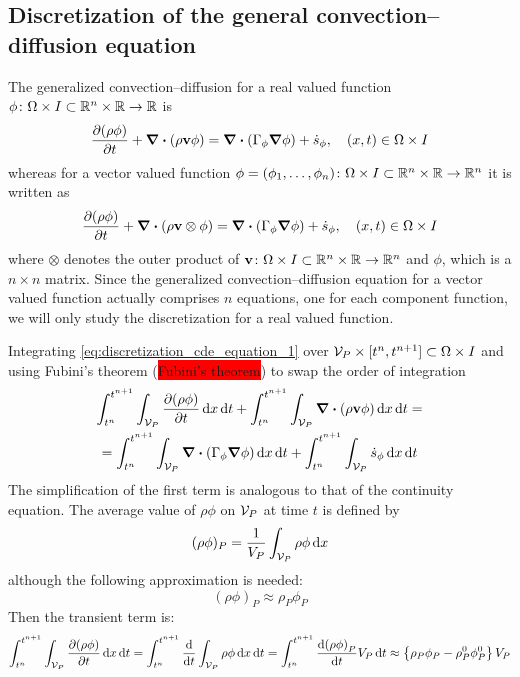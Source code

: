 
\subsection{Discretization of the general convection--diffusion equation}

The generalized convection--diffusion for a real valued function $\phi \colon
\Omega \times I \subset \mathbb{R}^n \times \mathbb{R} \rightarrow \mathbb{R}$ is
\begin{equation} \label{eq:discretization_cde_equation_1}
	\pdv{(\rho \phi)}{t} + \div(\rho \vb{v} \phi) = 
	\div(\Gamma_\phi \grad{\phi}) + \dot{s}_\phi,
	\quad (x, t) \in \Omega \times I
\end{equation}
whereas for a vector valued function $\phi = (\phi_1, \ldots, \phi_n) \colon
\Omega \times I \subset \mathbb{R}^n \times \mathbb{R} \rightarrow \mathbb{R}^n$ it is written
as
\begin{equation}
	\pdv{(\rho \phi)}{t} + \div(\rho \vb{v} \otimes \phi) = 
	\div(\Gamma_\phi \grad{\phi}) + \dot{s}_\phi,
	\quad (x, t) \in \Omega \times I
\end{equation}
where $\otimes$ denotes the outer product of $\vb{v} \colon \Omega \times I
\subset \mathbb{R}^n \times \mathbb{R} \rightarrow \mathbb{R}^n$ and $\phi$, which is a $n
\times n$ matrix. Since the generalized convection--diffusion equation for a
vector valued function actually comprises $n$ equations, one for each component
function, we will only study the discretization for a real valued function.

Integrating \eqref{eq:discretization_cde_equation_1} over $\mathcal{V}_{P} \times [t^n,
t^{n+1}] \subset \Omega \times I$ and using Fubini's theorem
(\colorbox{red}{Fubini's theorem}) to swap the order of integration
\begin{multline}
	\int_{t^n}^{t^{n+1}} \int_{\mathcal{V}_{P}} \pdv{(\rho \phi)}{t} \dd{x} \dd{t} + 
	\int_{t^n}^{t^{n+1}} \int_{\mathcal{V}_{P}} \div(\rho \vb{v} \phi) \dd{x} \dd{t} = \\ = 
	\int_{t^n}^{t^{n+1}} \int_{\mathcal{V}_{P}} \div(\Gamma_\phi \grad{\phi}) \dd{x} \dd{t} +
	\int_{t^n}^{t^{n+1}} \int_{\mathcal{V}_{P}} \dot{s}_\phi \dd{x} \dd{t}	
\end{multline}
The simplification of the first term is analogous to that of the continuity
equation. The average value of $\rho \phi$ on $\mathcal{V}_{P}$ at time $t$ is defined by
\begin{equation}
	(\rho \phi)_P = \frac{1}{V_P} \int_{\mathcal{V}_{P}} \rho \phi \dd{x}
\end{equation}
although the following approximation is needed:
\begin{equation}
	(\rho \phi)_P \approx \rho_P \phi_P
\end{equation}
Then the transient term is:
\begin{equation}
	\int_{t^n}^{t^{n+1}} \int_{\mathcal{V}_{P}} \pdv{(\rho \phi)}{t} \dd{x} \dd{t} = 
	\int_{t^n}^{t^{n+1}} \frac{\dd}{\dd{t}} \int_{\mathcal{V}_{P}} \rho \phi \dd{x} \dd{t} =  
	\int_{t^n}^{t^{n+1}} \frac{\dd(\rho \phi)_P}{\dd{t}} V_P \dd{t} \approx 
	\left\{ \rho_P \phi_P - \rho_P^0 \phi_P^0 \right\} V_P
\end{equation}

